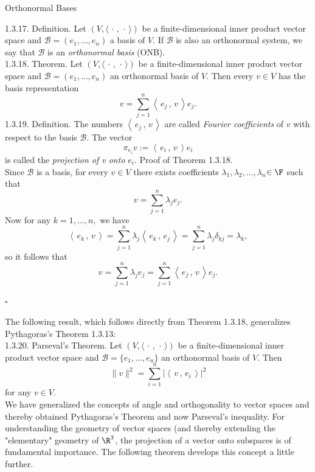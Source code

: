 \documentclass[smaller,hyperref={CJKbookmarks=true}]{beamer}
\newcommand{\myseries}[2]{$#1_1,#1_2,\dots,#1_#2$}
\newcommand{\scp}[2]{\left\langle\,#1\,,\,#2\,\right\rangle} \newcommand{\scpp}{\langle\,\cdot\,,\,\cdot\,\rangle}
\begin{document}
\begin{frame}{Orthonormal Bases}
\begin{spacing}{0.9}
\alert{1.3.17. Definition.} Let $(V,\scpp)$ be a finite-dimensional inner product vector space and $\mathcal{B}=(e_1,\ldots,e_n)$ a basis of $V$. If $\mathcal{B}$ is also an orthonormal system, we say that $\mathcal{B}$ is an \emph{orthonormal basis} (ONB).\\[12pt]
\alert{1.3.18. Theorem.} Let $(V,\scpp)$ be a finite-dimensional inner product vector space and $\mathcal{B}=(e_1,\ldots,e_n)$ an orthonormal basis of $V$. Then every $v\in V$ has the basis representation
\[v=\sum_{j=1}^{n}\scp{e_j}{v}e_j.\]
\alert{1.3.19. Definition.} The numbers $\scp{e_j}{v}$ are called \emph{Fourier coef{}ficients} of $v$ with respect to the basis $\mathcal{B}$. The vector
\[\pi_{e_i}v:=\scp{e_i}{v}e_i\]
is called the \emph{projection of v onto} $e_i$.
\newpage
\alert{Proof of Theorem 1.3.18.}\\
Since $\mathcal{B}$ is a basis, for every $v\in V$ there exists coef{}ficients \myseries{\lambda}{n}$\in\F$ such that
\[v=\sum_{j=1}^{n}\lambda_je_j.\]
Now for any $k=1,\ldots,n,$ we have
\[\scp{e_k}{v}=\sum_{j=1}^{n}\lambda_j\scp{e_k}{e_j}=\sum_{j=1}^{n}\lambda_j\delta_{kj}=\lambda_k,\]
so it follows that
\[v=\sum_{j=1}^{n}\lambda_je_j=\sum_{j=1}^{n}\scp{e_j}{v}e_j.\]
\begin{flushright}
  $\square$
\end{flushright}
\end{spacing}
\newpage
\begin{spacing}{1.05}
The following result, which follows directly from Theorem 1.3.18, generalizes Pythagoras's Theorem 1.3.13:\\
\alert{1.3.20. Parseval's Theorem.} Let $(V,\scpp)$ be a finite-dimensional inner product vector space and $\mathcal{B}=\{e_1,\ldots,e_n\}$ an orthonormal basis of $V$. Then
\begin{equation*}
  \|v\|^2=\sum_{i=1}^{n}|\scp{v}{e_i}|^2
\end{equation*}
for any $v\in V$.\\
We have generalized the concepts of angle and orthogonality to vector spaces and thereby obtained Pythagoras's Theorem and now Parseval's inequality. For understanding the geometry of vector spaces (and thereby extending the "elementary" geometry of $\R^3$, the projection of a vector onto subspaces is of fundamental importance. The following theorem
develops this concept a little further.
\end{spacing}
\end{frame}
\end{document}
